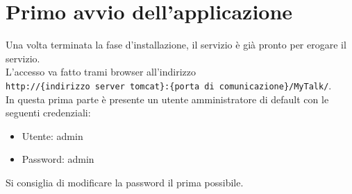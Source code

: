 \section{Primo avvio dell'applicazione}{
Una volta terminata la fase d'installazione, il servizio è già pronto per erogare il servizio.\\
L'accesso va fatto trami browser all'indirizzo\\
\texttt{http://\{indirizzo server tomcat\}:\{porta di comunicazione\}/MyTalk/}.\\
In questa prima parte è presente un utente amministratore di default con le seguenti credenziali:
\begin{itemize}
	\item Utente: admin
	\item Password: admin
\end{itemize}
Si consiglia di modificare la password il prima possibile.
}